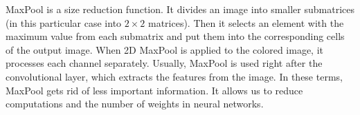 
MaxPool is a size reduction function. It divides an image into smaller submatrices
(in this particular case into $2 \times 2$ matrices). Then it selects an element with the maximum 
value from each submatrix
and put them into the corresponding cells of the output image. When 2D MaxPool is applied to 
the colored image, it processes each channel separately. Usually, MaxPool is used right after 
the convolutional layer, which extracts the features from the image. In these terms, 
MaxPool gets rid of less important information. It allows us to reduce computations and 
the number of weights in neural networks.
